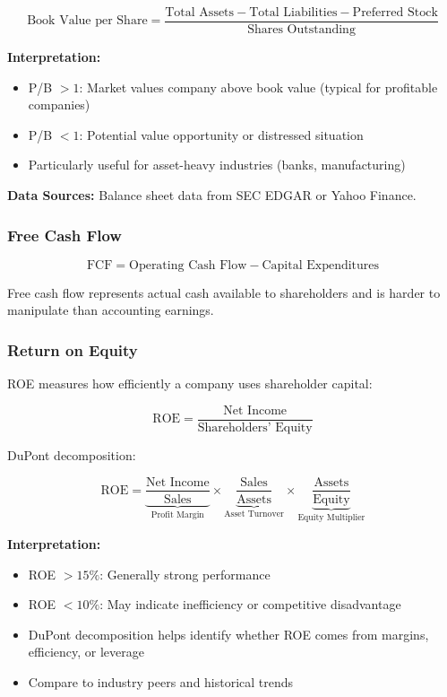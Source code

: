 \documentclass[11pt,a4paper]{article}
\begin{document}
\begin{equation}
\text{Book Value per Share} = \frac{\text{Total Assets} - \text{Total Liabilities} - \text{Preferred Stock}}{\text{Shares Outstanding}}
\end{equation}

\textbf{Interpretation:}
\begin{itemize}
    \item P/B $> 1$: Market values company above book value (typical for profitable companies)
    \item P/B $< 1$: Potential value opportunity or distressed situation
    \item Particularly useful for asset-heavy industries (banks, manufacturing)
\end{itemize}

\textbf{Data Sources:} Balance sheet data from SEC EDGAR or Yahoo Finance.

\subsubsection{Free Cash Flow}

\begin{equation}
\text{FCF} = \text{Operating Cash Flow} - \text{Capital Expenditures}
\end{equation}

Free cash flow represents actual cash available to shareholders and is harder to manipulate than accounting earnings.

\subsubsection{Return on Equity}

ROE measures how efficiently a company uses shareholder capital:

\begin{equation}
\text{ROE} = \frac{\text{Net Income}}{\text{Shareholders' Equity}}
\end{equation}

DuPont decomposition:

\begin{equation}
\text{ROE} = \underbrace{\frac{\text{Net Income}}{\text{Sales}}}_{\text{Profit Margin}} \times \underbrace{\frac{\text{Sales}}{\text{Assets}}}_{\text{Asset Turnover}} \times \underbrace{\frac{\text{Assets}}{\text{Equity}}}_{\text{Equity Multiplier}}
\end{equation}

\textbf{Interpretation:}
\begin{itemize}
    \item ROE $> 15\%$: Generally strong performance
    \item ROE $< 10\%$: May indicate inefficiency or competitive disadvantage
    \item DuPont decomposition helps identify whether ROE comes from margins, efficiency, or leverage
    \item Compare to industry peers and historical trends
\end{itemize}
\end{document}
